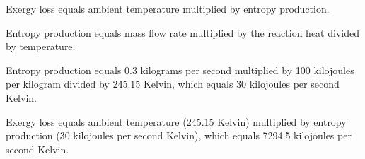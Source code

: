 Exergy loss equals ambient temperature multiplied by entropy production.  

Entropy production equals mass flow rate multiplied by the reaction heat divided by temperature.  

Entropy production equals 0.3 kilograms per second multiplied by 100 kilojoules per kilogram divided by 245.15 Kelvin, which equals 30 kilojoules per second Kelvin.  

Exergy loss equals ambient temperature (245.15 Kelvin) multiplied by entropy production (30 kilojoules per second Kelvin), which equals 7294.5 kilojoules per second Kelvin.